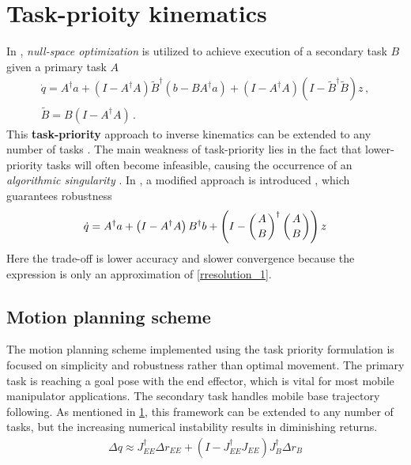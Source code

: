 \documentclass[times, utf8, diplomski, english]{fer}
\begin{document}
\section{Task-prioity kinematics}\label{section:task priority}
In \citep{nakamura1987task,nakamura1990advanced}, \textit{null-space optimization} is utilized to achieve execution of a secondary task $B$ given a primary task $A$
\begin{subequations}
\begin{gather}
\label{rresolution_1}
\dot{q}  = A^{\dagger}a + \left(I - A^{\dagger}A\right)\tilde{B}^{\dagger}\left(b - BA^{\dagger}a\right) + 
\left(I - A^{\dagger}A\right) \left(I - \tilde{B}^{\dagger}\tilde{B}\right)z\, ,\\
\tilde{B}  = B\left(I - A^{\dagger}A\right)\, .
\end{gather}
\end{subequations}
This \textbf{task-priority} approach to inverse kinematics can be extended to any number of tasks \citep{slotine1991general}.
The main weakness of task-priority lies in the fact that lower-priority tasks will often become infeasible, causing the occurrence of an \textit{algorithmic singularity} \citep{baillieul1985kinematic}.
In \citep{chiaverini1997singularity}, a modified approach is introduced , which guarantees robustness 
\begin{align}
\label{rresolution_2}
\dot{q} = A^{\dagger}a + \left(I - A^{\dagger}A\right)B^{\dagger}b + 
\left(I - \left(A \atop B\right)^{\dagger}\left(A \atop B\right)\right)z
\end{align}
Here the trade-off is lower accuracy and slower convergence because the expression is only an approximation of \eqref{rresolution_1}.
\subsection{Motion planning scheme}
The motion planning scheme implemented using the task priority formulation is focused on simplicity and robustness rather than optimal movement.
The primary task is reaching a goal pose with the end effector, which is vital for most mobile manipulator applications. 
The secondary task handles mobile base trajectory following.
As mentioned in \ref{section:task priority}, this framework can be extended to any number of tasks, but the increasing numerical instability results in diminishing returns.
\begin{align}
\label{rresolution_3}
\Delta q \approx J_{EE}^{\dagger}\Delta r_{EE} + \left(I - J_{EE}^{\dagger}J_{EE}\right)J_{B}^{\dagger}\Delta r_{B}
\end{align}
\end{document}
